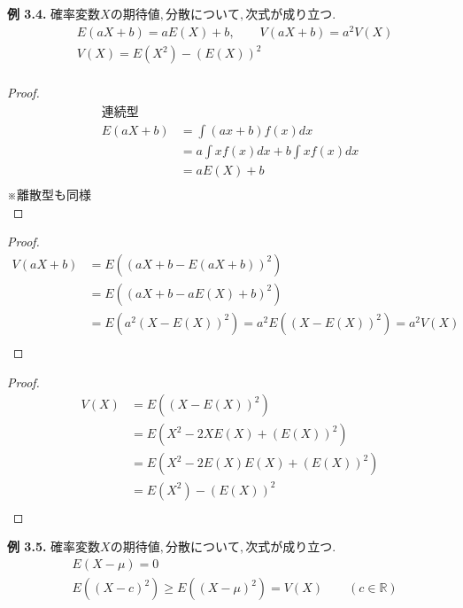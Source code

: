 \documentclass[dvipdfmx,10pt, a4j]{jarticle}
\theoremstyle{definition}
\begin{document}
\newpage
\noindent
\textbf{例 3.4.} $確率変数X の期待値, 分散について, 次式が成り立つ.$\\
\begin{align*}
     & E(aX + b) = aE(X) + b, \qquad V(aX + b) = a^2V(X) \\
     & V(X) = E(X^2) - (E(X))^2                          \\
\end{align*}
\begin{proof}
    \begin{align*}連続型                                       \\
        E(aX + b) & = \int (ax+b)f(x)dx              \\
                  & =a \int xf(x)dx + b \int xf(x)dx \\
                  & = aE(X)+b                        \\
    \end{align*}
    ※離散型も同様\\
\end{proof}
\begin{proof}
    \begin{align*}
        V(aX + b) & = E((aX + b - E(aX+b))^2)                     \\
                  & =E((aX+b-aE(X)+b)^2)                          \\
                  & = E(a^2(X-E(X))^2) = a^2E((X-E(X))^2)=a^2V(X) \\
    \end{align*}
\end{proof}
\begin{proof}
    \begin{align*}
        V(X) & = E((X-E(X))^2)                 \\
             & = E(X^2 - 2XE(X) + (E(X))^2)    \\
             & = E(X^2 - 2E(X)E(X) + (E(X))^2) \\
             & = E(X^2) - (E(X))^2             \\
    \end{align*}
\end{proof}
\noindent
\textbf{例 3.5.} $確率変数X の期待値, 分散について, 次式が成り立つ.$\\
\begin{align*}
     & E(X - \mu) = 0                                                    \\
     & E((X - c)^2) \geq E((X - \mu)^2) = V(X) \qquad (c \in \mathbb{R}) \\
\end{align*}
\end{document}

